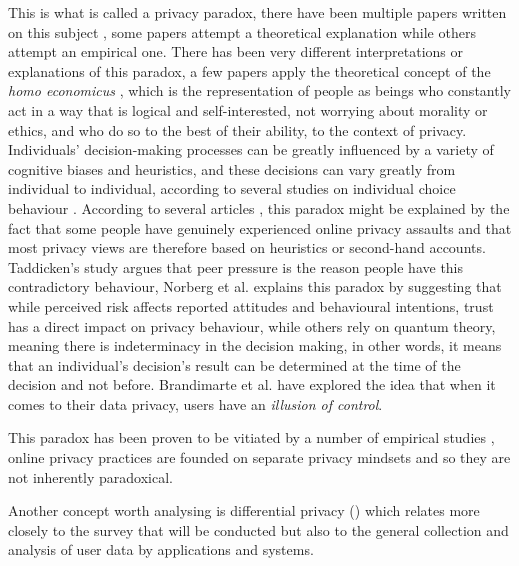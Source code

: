 This is what is called a privacy paradox, there have been multiple papers
written on this subject \cite{solove2021myth, WilliamsPrivacy, lee2021investigating, goad2021privacy, gerber2018explaining},
some papers attempt a theoretical explanation while others attempt an empirical
one. There has been very different interpretations or explanations of this
paradox, a few papers \cite{wilson2012unpacking, warshaw2015can, lee2015privacy}
apply the theoretical concept of the \textit{homo economicus} \cite{zak2008moral},
which is the representation of people as beings who constantly act in a
way that is logical and self-interested, not worrying about morality or
ethics, and who do so to the best of their ability, to the context of privacy.
Individuals' decision-making processes can be greatly influenced by a variety
of cognitive biases and heuristics, and these decisions can vary greatly from
individual to individual, according to several studies on individual choice behaviour \cite{knijnenburg2013dimensionality, wakefield2013influence, flender2012type}.
According to several articles \cite{dienlin2015privacy, baek2014solving},
this paradox might be explained by the fact that some people have genuinely
experienced online privacy assaults and that most privacy views are therefore
based on heuristics or second-hand accounts. Taddicken's study \cite{taddicken2014privacy}
argues that peer pressure is the reason people have this contradictory behaviour,
Norberg et al. \cite{norberg2007privacy} explains this paradox by suggesting
that while perceived risk affects reported attitudes and behavioural intentions,
trust has a direct impact on privacy behaviour, while others \cite{flender2012type, kokolakis2017privacy}
rely on quantum theory, meaning there is indeterminacy in the decision making,
in other words, it means that an individual's decision's result can be determined
at the time of the decision and not before. Brandimarte et al. \cite{brandimarte2013misplaced}
have explored the idea that when it comes to their data privacy, users have
an \textit{illusion of control}.

This paradox has been proven to be vitiated by a number of empirical studies \cite{dienlin2015privacy, xie2019consumers, SCHWAIG20131, sannon2018privacy},
online privacy practices are founded on separate privacy mindsets and so
they are not inherently paradoxical.

Another concept worth analysing is differential privacy (\hyperlink{\acronym}{\acronym}) which relates more
closely to the survey that will be conducted but also to the general
collection and analysis of user data by applications and systems.

